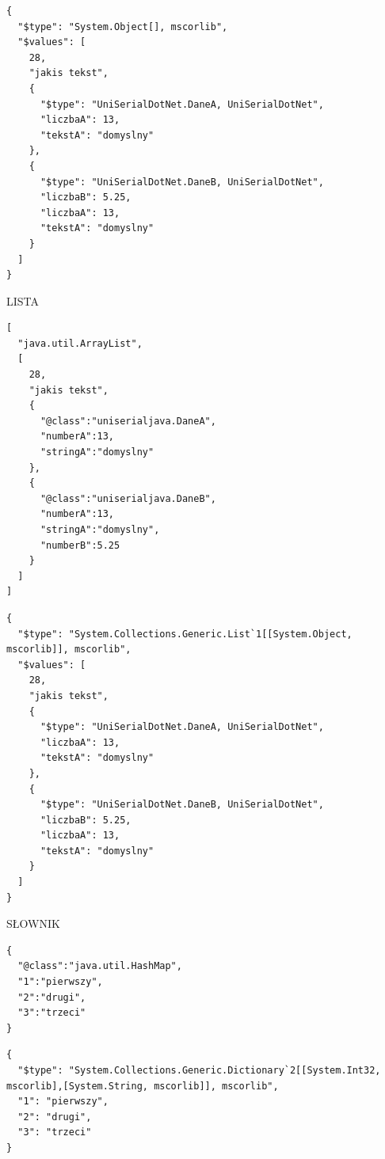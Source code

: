 \begin{lstlisting}[float, frame=single, caption={JSON.NET daje.}, label=kod:json-net-serilization]
{
  "$type": "System.Object[], mscorlib",
  "$values": [
    28,
    "jakis tekst",
    {
      "$type": "UniSerialDotNet.DaneA, UniSerialDotNet",
      "liczbaA": 13,
      "tekstA": "domyslny"
    },
    {
      "$type": "UniSerialDotNet.DaneB, UniSerialDotNet",
      "liczbaB": 5.25,
      "liczbaA": 13,
      "tekstA": "domyslny"
    }
  ]
}
\end{lstlisting}


LISTA
\begin{lstlisting}[float, frame=single, caption={Jackson daje. Lista}, label=kod:jackson-list-serilization]
[
  "java.util.ArrayList",
  [
    28,
    "jakis tekst",
    {
      "@class":"uniserialjava.DaneA",
      "numberA":13,
      "stringA":"domyslny"
    },
    {
      "@class":"uniserialjava.DaneB",
      "numberA":13,
      "stringA":"domyslny",
      "numberB":5.25
    }
  ]
]
\end{lstlisting}

\begin{lstlisting}[float, frame=single, caption={JSON.NET daje. Lista}, label=kod:json-net-list-serilization]
{
  "$type": "System.Collections.Generic.List`1[[System.Object, mscorlib]], mscorlib",
  "$values": [
    28,
    "jakis tekst",
    {
      "$type": "UniSerialDotNet.DaneA, UniSerialDotNet",
      "liczbaA": 13,
      "tekstA": "domyslny"
    },
    {
      "$type": "UniSerialDotNet.DaneB, UniSerialDotNet",
      "liczbaB": 5.25,
      "liczbaA": 13,
      "tekstA": "domyslny"
    }
  ]
}
\end{lstlisting}

SŁOWNIK
\begin{lstlisting}[float, frame=single, caption={Jackson daje. Słownik}, label=kod:jackson-dict-serilization]
{
  "@class":"java.util.HashMap",
  "1":"pierwszy",
  "2":"drugi",
  "3":"trzeci"
}
\end{lstlisting}


\begin{lstlisting}[float, frame=single, caption={JSON.NET daje. Słownik}, label=kod:json-net-dict-serilization]
{
  "$type": "System.Collections.Generic.Dictionary`2[[System.Int32, mscorlib],[System.String, mscorlib]], mscorlib",
  "1": "pierwszy",
  "2": "drugi",
  "3": "trzeci"
}
\end{lstlisting}


